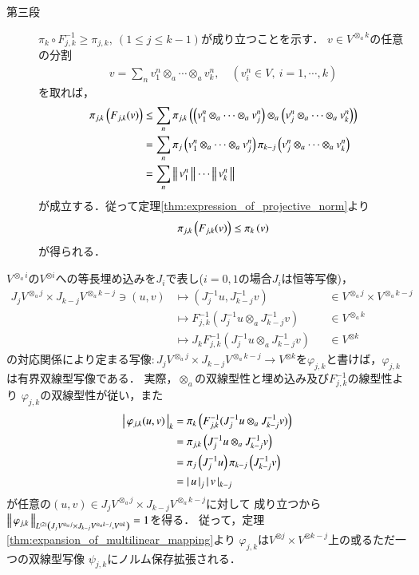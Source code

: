 \begin{prf}
\begin{description}
			\item[第三段]
				$\pi_k \circ F^{-1}_{j,k} \geq \pi_{j,k},\ (1 \leq j \leq k-1)$が成り立つことを示す．
				$v \in V^{\otimes_a k}$の任意の分割
				\begin{align}
					v = \sum_n v^n_1 \otimes_a \cdots \otimes_a v^n_k,
					\quad (v^n_i \in V,\ i=1,\cdots,k)
				\end{align}
				を取れば，
				\begin{align}
					\projectivenorm{F_{j,k}(v)}{j,k}
					&\leq \sum_n \projectivenorm{\left( v^n_1 \otimes_a \cdots \otimes_a v^n_j \right) \otimes_a \left( v^n_j \otimes_a \cdots \otimes_a v^n_k \right)}{j,k} \\
					&= \sum_n \projectivenorm{v^n_1 \otimes_a \cdots \otimes_a v^n_j}{j}
						\projectivenorm{v^n_j \otimes_a \cdots \otimes_a v^n_k}{k-j} \\
					&= \sum_n \Norm{v^n_1}{} \cdots \Norm{v^n_k}{}
				\end{align}
				が成立する．従って定理\ref{thm:expression_of_projective_norm}より
				\begin{align}
					\projectivenorm{F_{j,k}(v)}{j,k} \leq \projectivenorm{v}{k}
				\end{align}
				が得られる．
				\QED
		\end{description}
	\end{prf}
	
	
	$V^{\otimes_a i}$の$V^{\otimes i}$への等長埋め込みを$J_i$で表し($i=0,1$の場合$J_i$は恒等写像)，
	\begin{align}
		J_j V^{\otimes_a j} \times J_{k-j} V^{\otimes_a k-j} \ni (u,v)
		& \longmapsto ( J_j^{-1}u,J_{k-j}^{-1}v ) &&\in V^{\otimes_a j} \times V^{\otimes_a k-j} \\
		& \longmapsto F_{j,k}^{-1} (J_j^{-1}u \otimes_a J_{k-j}^{-1}v) &&\in V^{\otimes_a k} \\
		& \longmapsto J_k F_{j,k}^{-1} (J_j^{-1}u \otimes_a J_{k-j}^{-1}v) &&\in V^{\otimes k}
	\end{align}
	の対応関係により定まる写像$:J_j V^{\otimes_a j} \times J_{k-j} V^{\otimes_a k-j}
	\longrightarrow V^{\otimes k}$を$\varphi_{j,k}$と書けば，$\varphi_{j,k}$は有界双線型写像である．
	実際，$\otimes_a$の双線型性と埋め込み及び$F_{j,k}^{-1}$の線型性より
	$\varphi_{j,k}$の双線型性が従い，また
	\begin{align}
		\compcrossnorm{\varphi_{j,k}(u,v)}{k}
		&= \projectivenorm{F_{j,k}^{-1} (J_j^{-1}u \otimes_a J_{k-j}^{-1}v)}{k} \\
		&= \projectivenorm{J_j^{-1}u \otimes_a J_{k-j}^{-1}v}{j,k} \\
		&= \projectivenorm{J_j^{-1}u}{j} \projectivenorm{J_{k-j}^{-1}v}{k-j} \\
		&= \compcrossnorm{u}{j} \compcrossnorm{v}{k-j}
	\end{align}
	が任意の$(u,v) \in J_j V^{\otimes_a j} \times J_{k-j} V^{\otimes_a k-j}$に対して
	成り立つから$\Norm{\varphi_{j,k}}{\ContLn{J_j V^{\otimes_a j} \times J_{k-j} V^{\otimes_a k-j}}{V^{\otimes k}}{2}} = 1$を得る．
	従って，定理\ref{thm:expansion_of_multilinear_mapping}より
	$\varphi_{j,k}$は$V^{\otimes j} \times V^{\otimes k-j}$上の或るただ一つの双線型写像
	$\psi_{j,k}$にノルム保存拡張される．
	
